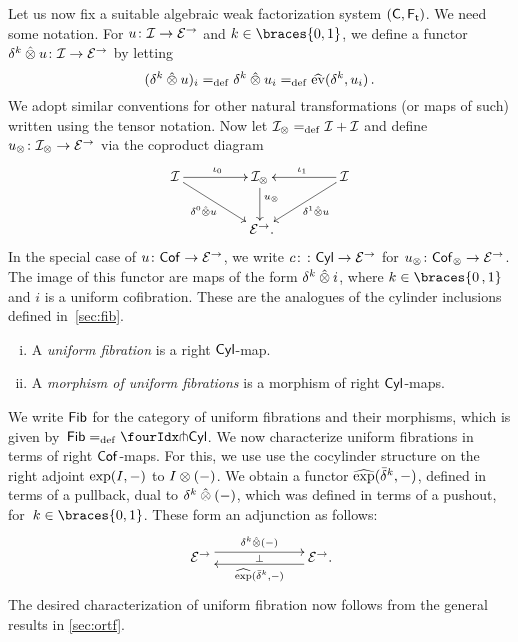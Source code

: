 \documentclass[reqno,10pt,a4paper,oneside,draft]{amsart}
\begin{document}
{{Let us now fix a suitable algebraic weak factorization system $(\mathsf{C}, \mathsf{F_t})$. 
We need some notation. For $u \colon \mathcal{I} \to \mathcal{E}^\to$ and $k \in \braces{0, 1}$, we define a functor $\delta^k \mathbin{\hat{\otimes}} u \colon \mathcal{I} \to \mathcal{E}^\to$ by letting
\[
  (\delta^k \mathbin{\hat{\otimes}} u)_i =_{\operatorname{def}} \delta^k \mathbin{\hat{\otimes}} u_i  =_{\operatorname{def}} \widehat{\operatorname{ev}}(\delta^k, u_i) \, .
\]
We adopt similar conventions for other natural transformations (or maps of such) written using the tensor notation.
Now let $\mathcal{I}_\otimes =_{\operatorname{def}} \mathcal{I} + \mathcal{I}$ and define $u_\otimes \colon \mathcal{I}_\otimes \to \mathcal{E}^\to$ via the coproduct diagram
\begin{equation} \label{equ:u-tensor}
\begin{gathered}
\xymatrix@C+2em{
  \cal{I}
  \ar[r]^{\iota_0}
  \ar[dr]_-{\lcyl \hatotimes u}
&
  \cal{I}_\otimes
  \ar[d]^(.4){u_\otimes}
&
  \cal{I}
  \ar[dl]^-{\rcyl \hatotimes u}
  \ar[l]_{\iota_1}
\\&
  \catE^\to
\rlap{.}}
\end{gathered}
\end{equation}
In the special case of $u \colon \mathsf{Cof} \to \mathcal{E}^\to$, we write $c \colon \colon \mathsf{Cyl} \to \mathcal{E}^\to$ for $u_\otimes \colon \mathsf{Cof}_\otimes \to \mathcal{E}^\to$.
The image of this functor are maps of the form $\delta^k \mathbin{\hat{\otimes}} i$, where $k \in \braces{ 0 \, , 1}$ and $i$ is a uniform
cofibration. These are the analogues of the cylinder inclusions defined in~\cref{sec:fib}.


\begin{definition} \label{def:I-fibration} \hfill 
\begin{enumerate}[(i)]
\item A \emph{uniform fibration} is a right $\mathsf{Cyl}$-map.
\item A \emph{morphism of uniform fibrations} is a morphism of right $\mathsf{Cyl}$-maps.
\end{enumerate}
\end{definition}


We write $\mathsf{Fib}$ for the category of uniform fibrations and their morphisms, which is given by~$\Fib  \defeq \liftr{\Cyl}$. We now characterize uniform fibrations in terms of right $\mathsf{Cof}$-maps. For this, we use use the cocylinder structure on the right adjoint $\exp(I, -)$ to $I \otimes (-)$. We obtain a functor $\operatorname{\widehat{exp}}(\bar{\delta}^k, -)$, defined in terms of a pullback, dual to $\delta^k \mathbin{\hat{\otimes}} (-)$, which was defined in terms of a pushout, for~$k \in \braces{0, 1}$. These form an adjunction as follows:
\[
\xymatrix@C+4em{
  \catE^\to
  \ar@<1ex>[r]^{\kcyl \hatotimes (-)}
  \ar@{}[r]|{\bot}
&
  \catE^\to
  \ar@<1ex>[l]^{\hatexp(\bar{\delta}^k, -)}
\rlap{.}}
\]
The desired characterization of uniform fibration now follows from the general results in \cref{sec:ortf}.

}}
\end{document}
